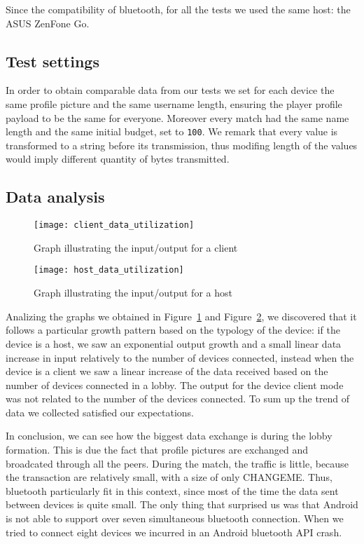 Since the compatibility of bluetooth, for all the tests we used the same host: 
the ASUS ZenFone Go.

\subsection{Test settings}

In order to obtain comparable data from our tests we set for each device 
the same profile picture and the same username length, ensuring the player 
profile payload to be the same for everyone. Moreover every match had the same 
name length and the same initial budget, set to \texttt{100}. We remark 
that every value is transformed to a string before its transmission, thus
modifing length of the values would imply different quantity of bytes transmitted.

\subsection{Data analysis}
\begin{figure}[t]
 \centering
 \texttt{[image: client\_data\_utilization]}
 \caption{Graph illustrating the input/output for a client}
 \label{fig:res:cdu}
\end{figure}

\begin{figure}[t]
 \centering
 \texttt{[image: host\_data\_utilization]}
 \caption{Graph illustrating the input/output for a host}
 \label{fig:res:hdu}
\end{figure}

Analizing the graphs we obtained in Figure~\ref{fig:res:cdu} and 
Figure~\ref{fig:res:hdu}, we discovered that it follows a particular growth 
pattern based on the typology of the device: if the device is a host, we saw an 
exponential output growth and a small linear data increase in input relatively 
to the number of devices connected, instead when the device is a client we saw a 
linear increase of the data received based on the number of devices connected in 
a lobby. The output for the device client mode was not related to the number of 
the devices connected. To sum up the trend of data we collected satisfied our 
expectations.

In conclusion, we can see how the biggest data exchange is during the lobby 
formation. This is due the fact that profile pictures are exchanged and 
broadcated through all the peers. During the match, the traffic is little, 
because the transaction are relatively small, with a size of only 
CHANGEME. Thus, bluetooth particularly 
fit in this context, since most of the time the data sent between devices is 
quite small.
The only thing that surprised us was that Android is not able to support over 
seven simultaneous bluetooth connection. When we tried to connect eight devices 
we incurred in an Android bluetooth API crash.
